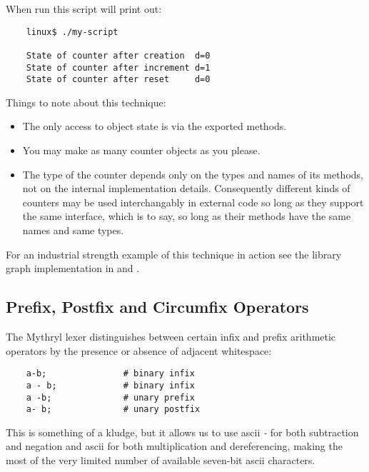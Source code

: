 When run this script will print out:

\begin{verbatim}
    linux$ ./my-script

    State of counter after creation  d=0
    State of counter after increment d=1
    State of counter after reset     d=0
\end{verbatim}

Things to note about this technique:

\begin{itemize}
\item The only access to object state is via the exported methods.
\item You may make as many counter objects as you please.
\item The type of the counter depends only on the types and names of its methods, 
      not on the internal implementation details.  Consequently different kinds 
      of counters may be used interchangably in external code so long as they 
      support the same interface, which is to say, so long as their methods have 
      the same names and same types.
\end{itemize}

For an industrial strength example of this technique in action see the library 
graph implementation in  
 and 
.

\cutend*


\subsection{Prefix, Postfix and Circumfix Operators}

The Mythryl lexer distinguishes between certain infix and prefix arithmetic 
operators by the presence or absence of adjacent whitespace:

\begin{verbatim}
    a-b;               # binary infix
    a - b;             # binary infix
    a -b;              # unary prefix
    a- b;              # unary postfix
\end{verbatim}

This is something of a kludge, but it allows us to use ascii 
{\it -} for both subtraction and negation and ascii {\tt *} for 
both multiplication and dereferencing, making the most of the 
very limited number of available seven-bit ascii characters.

